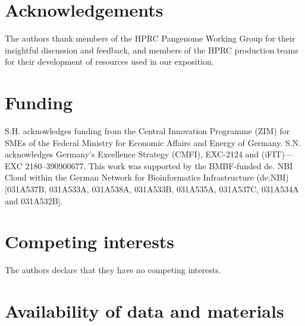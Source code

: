 \documentclass[11pt,hidelinks]{article}
\begin{document}



\section*{Acknowledgements}
The authors thank members of the HPRC Pangenome Working Group for their insightful discussion and feedback, and members of the HPRC production teams for their development of resources used in our exposition.

\section*{Funding}
S.H. acknowledges funding from the Central Innovation Programme (ZIM) for SMEs of the Federal Ministry for Economic Affairs and Energy of Germany. S.N. acknowledges Germany’s Excellence Strategy (CMFI), EXC-2124 and (iFIT)—EXC 2180–390900677. This work was supported by the BMBF-funded de. NBI Cloud within the German Network for Bioinformatics Infrastructure (de.NBI) [031A537B, 031A533A, 031A538A, 031A533B, 031A535A, 031A537C, 031A534A and 031A532B].

\section*{Competing interests}
The authors declare that they have no competing interests.

\section*{Availability of data and materials}
\end{document}
